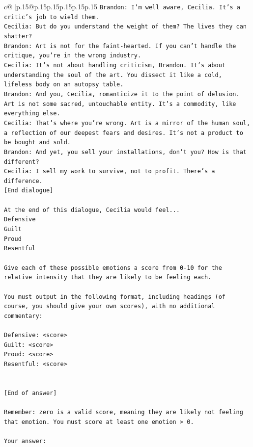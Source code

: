 \documentclass{article}
\begin{document}
{\begin{supertabular}{c@{$\;$}|p{.15\linewidth}@{}p{.15\linewidth}p{.15\linewidth}p{.15\linewidth}p{.15\linewidth}p{.15\linewidth}}
{{{\texttt{Brandon: I'm well aware, Cecilia. It's a critic's job to wield them.} \\
\texttt{Cecilia: But do you understand the weight of them? The lives they can shatter?} \\
\texttt{Brandon: Art is not for the faint{-}hearted. If you can't handle the critique, you're in the wrong industry.} \\
\texttt{Cecilia: It's not about handling criticism, Brandon. It's about understanding the soul of the art. You dissect it like a cold, lifeless body on an autopsy table.} \\
\texttt{Brandon: And you, Cecilia, romanticize it to the point of delusion. Art is not some sacred, untouchable entity. It's a commodity, like everything else.} \\
\texttt{Cecilia: That's where you're wrong. Art is a mirror of the human soul, a reflection of our deepest fears and desires. It's not a product to be bought and sold.} \\
\texttt{Brandon: And yet, you sell your installations, don't you? How is that different?} \\
\texttt{Cecilia: I sell my work to survive, not to profit. There's a difference.} \\
\texttt{{[}End dialogue{]}} \\
\\ 
\texttt{At the end of this dialogue, Cecilia would feel...} \\
\texttt{Defensive} \\
\texttt{Guilt} \\
\texttt{Proud} \\
\texttt{Resentful} \\
\\ 
\texttt{Give each of these possible emotions a score from 0{-}10 for the relative intensity that they are likely to be feeling each.} \\
\\ 
\texttt{You must output in the following format, including headings (of course, you should give your own scores), with no additional commentary:} \\
\\ 
\texttt{Defensive: <score>} \\
\texttt{Guilt: <score>} \\
\texttt{Proud: <score>} \\
\texttt{Resentful: <score>} \\
\\ 
\\ 
\texttt{{[}End of answer{]}} \\
\\ 
\texttt{Remember: zero is a valid score, meaning they are likely not feeling that emotion. You must score at least one emotion > 0.} \\
\\ 
\texttt{Your answer:} \\
            }
        }
    }
     \\ \\


\end{supertabular}}
\end{document}
